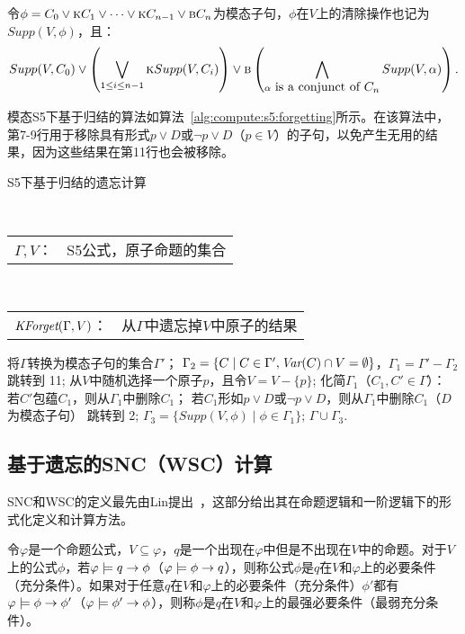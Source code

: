 令$\phi=C_0 \vee \textsc{k} C_1 \vee \dots \vee \textsc{k} C_{n-1} \vee \textsc{b} C_n$为模态子句，$\phi$在$V$上的清除操作也记为$Supp(V,\phi)$，且：
$$Supp(V, C_0) \vee \left(\bigvee_{1\leq i\leq n-1} \textsc{k} Supp(V, C_i)\right) \vee \textsc{b}\left(\bigwedge_{\alpha\hbox{ is a conjunct of $C_n$}} Supp(V, \alpha)\right).$$

模态S5下基于归结的算法如算法~\ref{alg:compute:s5:forgetting}所示。在该算法中，第7-9行用于移除具有形式$p\vee D$或$\neg p \vee D$（$p\in V$）的子句，以免产生无用的结果，因为这些结果在第11行也会被移除。


\begin{algorithm}[htbp]
	\small
	\caption{S5下基于归结的遗忘计算}%
	\label{alg:compute:s5:forgetting}
	\begin{algorithmic}[1]
		\REQUIRE ~~\\
		\begin{tabular}[t]{p{8mm}l}
			$\Gamma, V$：& S5公式，原子命题的集合
		\end{tabular}
		\ENSURE ~~\\
		\begin{tabular}[t]{p{8mm}l}
			$\textit{KForget}(\Gamma, V)$：  & \qquad \quad 从$\Gamma$中遗忘掉$V$中原子的结果
		\end{tabular}
		\STATE 将$\Gamma$转换为模态子句的集合$\Gamma'$；
		\STATE $\Gamma_2=\{C\mid C\in \Gamma', \textit{Var}(C) \cap V = \emptyset\}$，$\Gamma_1=\Gamma' - \Gamma_2$
		\STATE 跳转到 11;
		\ENDIF
		\STATE 从$V$中随机选择一个原子$p$，且令$V = V -\{p\}$;
		\STATE 化简$\Gamma_1$（$C_1, C'\in \Gamma$）：
		\STATE \qquad 若$C'$包蕴$C_1$，则从$\Gamma_1$中删除$C_1$；
		\STATE \qquad 若$C_1$形如$p\vee D$或$\neg p \vee D$，则从$\Gamma_1$中删除$C_1$（$D$为模态子句）
		\STATE 跳转到 2;
		\STATE $\Gamma_3=\{Supp(V, \phi) \mid \phi \in \Gamma_1\}$;
		\RETURN $\Gamma \cup \Gamma_3$.
	\end{algorithmic}
\end{algorithm}


\subsection{基于遗忘的SNC（WSC）计算}
SNC和WSC的定义最先由Lin提出~\cite{DBLP:journals/ai/Lin01}，这部分给出其在命题逻辑和一阶逻辑下的形式化定义和计算方法。

\begin{definition}
	令$\varphi$是一个命题公式，$V\subseteq \varphi$，$q$是一个出现在$\varphi$中但是不出现在$V$中的命题。对于$V$上的公式$\phi$，若$\varphi \models q \rightarrow \phi$（$\varphi \models \phi \rightarrow q$），则称公式$\phi$是$q$在$V$和$\varphi$上的必要条件（充分条件）。如果对于任意$q$在$V$和$\varphi$上的必要条件（充分条件）$\phi'$都有$\varphi \models \phi \rightarrow \phi'$（$\varphi \models \phi' \rightarrow \phi$），则称$\phi$是$q$在$V$和$\varphi$上的最强必要条件（最弱充分条件）。
\end{definition}

